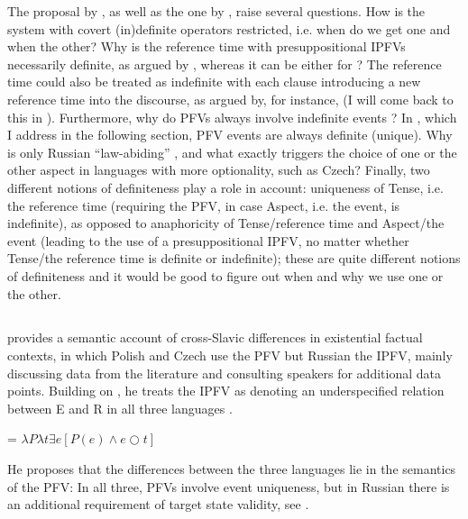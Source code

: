 \documentclass[output=paper,colorlinks,citecolor=brown]{langscibook}
\begin{document}
The proposal by \citet{alvestad13}, as well as the one by \citet{gronn15,gronnstechow16}, raise several questions. How is the system with covert (in)definite operators restricted, i.e. when do we get one and when the other?  Why is the reference time with presuppositional IPFVs necessarily definite, as argued by \citet{gronnstechow16}, whereas it can be either for \citet{alvestad13}? The reference time could also be treated as indefinite with each clause introducing a new reference time into the discourse, as argued by, for instance, \citet{gehrketrueipf} (I will come back to this in ). Furthermore, why do PFVs always involve indefinite events \citep{alvestad13}?  In \citet{Mueller-Reichau2018a}, which I address in the following section, PFV events are always definite (unique). Why is only Russian ``law-abiding'' \citep{alvestad13}, and what exactly triggers the choice of one or the other aspect in languages with more optionality, such as Czech? Finally, two different notions of definiteness play a role in  account: uniqueness of Tense, i.e. the reference time (requiring the PFV, in case Aspect, i.e. the event, is indefinite), as opposed to anaphoricity of Tense/reference time and Aspect/the event (leading to the use of a presuppositional IPFV, no matter whether Tense/the reference time is definite or indefinite); these are quite different notions of definiteness and it would be good to figure out when and why we use one or the other. 

\subsection{\citet{Mueller-Reichau2018a,mueller23}}
\label{sec:mueller}

\citet{Mueller-Reichau2018a} provides a semantic account of cross-Slavic differences in existential factual contexts, in which Polish and Czech use the PFV but Russian the IPFV, mainly discussing data from the literature and consulting speakers for additional data points. Building on \citet{gronndiss}, he treats the IPFV as denoting an underspecified relation between E and R in all three languages .

\ea\label{ex:muelleripfv} 
 = $\lambda P \lambda t \exists e [P(e) \wedge e \bigcirc t]$
\z 

\noindent He proposes that the differences between the three languages lie in the semantics of the PFV: In all three, PFVs involve event uniqueness, but in Russian there is an additional requirement of target state validity, see .
\end{document}
